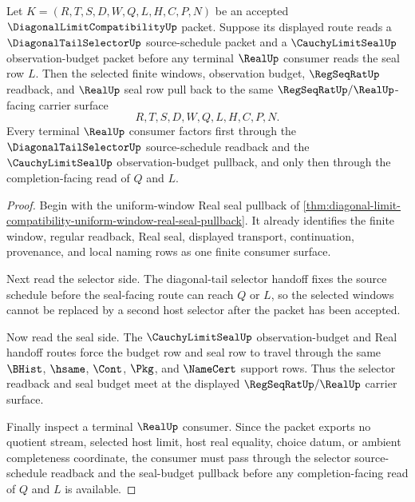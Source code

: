 \begin{theorem}
\label{thm:diagonal-limit-compatibility-selector-seal-pullback}
Let $K=(R,T,S,D,W,Q,L,H,C,P,N)$ be an accepted $\DiagonalLimitCompatibilityUp$ packet. Suppose its displayed route reads a $\DiagonalTailSelectorUp$ source-schedule packet and a $\CauchyLimitSealUp$ observation-budget packet before any terminal $\RealUp$ consumer reads the seal row $L$. Then the selected finite windows, observation budget, $\RegSeqRatUp$ readback, and $\RealUp$ seal row pull back to the same $\RegSeqRatUp/\RealUp$-facing carrier surface
$$
R,T,S,D,W,Q,L,H,C,P,N.
$$
Every terminal $\RealUp$ consumer factors first through the $\DiagonalTailSelectorUp$ source-schedule readback and the $\CauchyLimitSealUp$ observation-budget pullback, and only then through the completion-facing read of $Q$ and $L$.
\end{theorem}
\begin{proof}
Begin with the uniform-window Real seal pullback of \autoref{thm:diagonal-limit-compatibility-uniform-window-real-seal-pullback}. It already identifies the finite window, regular readback, Real seal, displayed transport, continuation, provenance, and local naming rows as one finite consumer surface.

Next read the selector side. The diagonal-tail selector handoff fixes the source schedule before the seal-facing route can reach $Q$ or $L$, so the selected windows cannot be replaced by a second host selector after the packet has been accepted.

Now read the seal side. The $\CauchyLimitSealUp$ observation-budget and Real handoff routes force the budget row and seal row to travel through the same $\BHist$, $\hsame$, $\Cont$, $\Pkg$, and $\NameCert$ support rows. Thus the selector readback and seal budget meet at the displayed $\RegSeqRatUp/\RealUp$ carrier surface.

Finally inspect a terminal $\RealUp$ consumer. Since the packet exports no quotient stream, selected host limit, host real equality, choice datum, or ambient completeness coordinate, the consumer must pass through the selector source-schedule readback and the seal-budget pullback before any completion-facing read of $Q$ and $L$ is available.
\end{proof}

